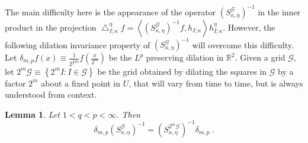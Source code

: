 \documentclass{amsart}%
\theoremstyle{plain}
\newtheorem{lemma}[theorem]{Lemma}
\numberwithin{equation}{section}
\begin{document}
The main difficulty here is the appearance of the operator $\left(
S_{\kappa,\eta}^{\mathcal{G}}\right)  ^{-1}$ in the inner product in the
projection $\bigtriangleup_{I;\kappa}^{\eta}f=\left\langle \left(
S_{\kappa,\eta}^{\mathcal{G}}\right)  ^{-1}f,h_{I;\kappa}\right\rangle
h_{I;\kappa}^{\eta}$. However, the following dilation invariance property of
$\left(  S_{\kappa,\eta}^{\mathcal{G}}\right)  ^{-1}$ will overcome this
difficulty. Let $\delta_{m,p}f\left(  x\right)  \equiv\frac{1}{2^{\frac{2}%
{p}m}}f\left(  \frac{x}{2^{m}}\right)  $ be the $L^{p}$ preserving dilation in
$\mathbb{R}^{2}$. Given a grid $\mathcal{G}$, let $2^{m}\mathcal{G}%
\equiv\left\{  2^{m}I:I\in\mathcal{G}\right\}  $ be the grid obtained by
dilating the squares in $\mathcal{G}$ by a factor $2^{m}$ about a fixed point
in $U$, that will vary from time to time, but is always understood from context.

\begin{lemma}
Let $1<q<p<\infty$. Then%
\begin{equation}
\delta_{m,p}\left(  S_{\kappa,\eta}^{\mathcal{G}}\right)  ^{-1}=\left(
S_{\kappa,\eta}^{2^{m}\mathcal{G}}\right)  ^{-1}\delta_{m,p}\ .\label{claim}%
\end{equation}

\end{lemma}
\end{document}
